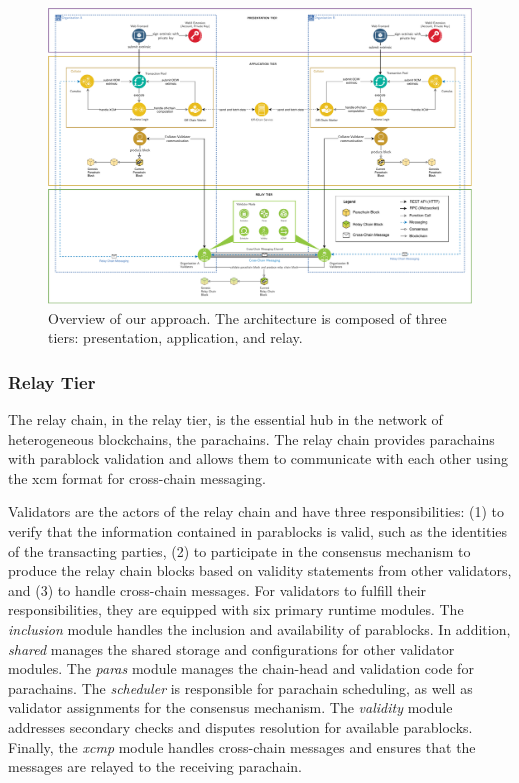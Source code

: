 \documentclass[conference,a4paper,flushend]{neutr}
\begin{document}
\begin{figure}[!p]
  \centering
  \includegraphics[width=0.91\textheight,angle=90,origin=c]{fig-approach_overview_edit.pdf}
  \caption{Overview of our approach. The architecture is composed of three tiers: presentation, application, and relay. }
	\label{fig:system_architecture}
\end{figure}

\subsubsection{Relay Tier} \label{s:relay_tier}
The relay chain, in the relay tier, is the essential hub in the network of heterogeneous blockchains, the parachains. The relay chain provides parachains with parablock validation and allows them to communicate with each other using the \ac{xcm} format for cross-chain messaging.

Validators are the actors of the relay chain and have three responsibilities: (1) to verify that the information contained in parablocks is valid, such as the identities of the transacting parties, (2) to participate in the consensus mechanism to produce the relay chain blocks based on validity statements from other validators, and (3) to handle cross-chain messages. For validators to fulfill their responsibilities, they are equipped with six primary runtime modules. The \textit{inclusion} module handles the inclusion and availability of parablocks. In addition, \textit{shared} manages the shared storage and configurations for other validator modules. The \textit{paras} module manages the chain-head and validation code for parachains. The \textit{scheduler} is responsible for parachain scheduling, as well as validator assignments for the consensus mechanism. The \textit{validity} module addresses secondary checks and disputes resolution for available parablocks. Finally, the \textit{\ac{xcmp}} module handles cross-chain messages and ensures that the messages are relayed to the receiving parachain. 
\end{document}
